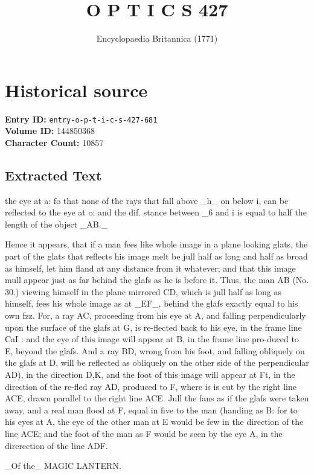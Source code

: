 \documentclass{article}
\title{O P T I C S 427}
\date{Encyclopaedia Britannica (1771)}
\begin{document}
\maketitle

\section*{Historical source}
\textbf{Entry ID:} \texttt{entry-o-p-t-i-c-s-427-681} \\
\textbf{Volume ID:} 144850368 \\
\textbf{Character Count:} 10857

\subsection*{Extracted Text}
the eye at a: fo that none of the rays that fall above \_h\_ on below i, can be reflected to the eye at o; and the dif. stance between \_6 and i is equal to half the length of the object \_AB.\_

Hence it appears, that if a man fees like whole image in a plane looking glats, the part of the glats that reflects his image melt be jull half as long and half as broad as himself, let him fland at any distance from it whatever; and that this image mull appear just as far behind the glafs as he is before it. Thus, the man AB (No. 30.) viewing himself in the plane mirrored CD, which is jull half as long as himself, fees his whole image as at \_EF\_, behind the glafs exactly equal to his own fzz. For, a ray AC, proceeding from his eye at A, and falling perpendicularly upon the surface of the glafs at G, is re-flected back to his eye, in the frame line CaI : and the eye of this image will appear at B, in the frame line pro-duced to E, beyond the glafs. And a ray BD, wrong from his foot, and falling obliquely on the glafs at D, will be reflected as obliquely on the other side of the perpendicular AD), in the direction D,K, and the foot of this image will appear at Ft, in the direction of the re-fled ray AD, produced to F, where is is cut by the right line ACE, drawn parallel to the right line ACE. Jull the fans as if the glafs were taken away, and a real man flood at F, equal in five to the man (handing as B: for to his eyes at A, the eye of the other man at E would be few in the direction of the line ACE; and the foot of the man as F would be seen by the eye A, in the direrection of the line ADF.

\_Of the\_ MAGIC LANTERN.
\end{document}
